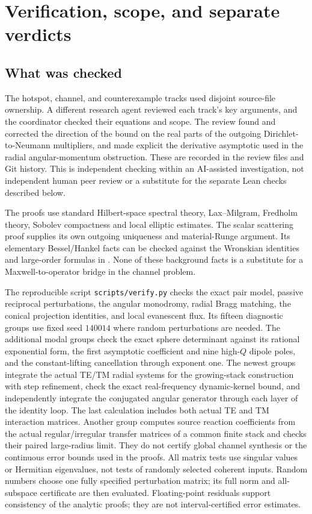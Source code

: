 \section{Verification, scope, and separate verdicts}
\label{ver:section}

\subsection{What was checked}
The hotspot, channel, and counterexample tracks used disjoint source-file
ownership. A different research agent reviewed each track's key arguments,
and the coordinator checked their equations and scope. The review found and
corrected the direction of the bound on the real parts of the outgoing
Dirichlet-to-Neumann multipliers, and made explicit the derivative
asymptotic used in the radial angular-momentum obstruction. These are
recorded in the review files and Git history. This is independent checking
within an AI-assisted investigation, not independent human peer review or
a substitute for the separate Lean checks described below.

The proofs use standard Hilbert-space spectral theory, Lax--Milgram,
Fredholm theory, Sobolev compactness and local elliptic estimates. The
scalar scattering proof supplies its own outgoing uniqueness and
material-Runge argument. Its elementary Bessel/Hankel facts can be checked
against the Wronskian identities and large-order formulas in
\cite{dlmf}. None of these background facts is a substitute for a
Maxwell-to-operator bridge in the channel problem.

The reproducible script \texttt{scripts/verify.py} checks the exact pair
model, passive reciprocal perturbations, the angular monodromy, radial
Bragg matching, the conical projection identities, and local evanescent
flux. Its fifteen diagnostic groups use fixed seed $140014$ where
random perturbations are needed.  The additional modal groups check
the exact sphere determinant against its rational exponential form,
the first asymptotic coefficient and nine high-$Q$ dipole poles,
and the constant-lifting cancellation through exponent one.
The newest groups integrate the actual TE/TM radial systems for the
growing-stack construction with step refinement, check the exact
real-frequency dynamic-kernel bound, and independently integrate the
conjugated angular generator through each layer of the identity loop.
The last calculation includes both actual TE and TM interaction matrices.
Another group computes source reaction coefficients from the actual
regular/irregular transfer matrices of a common finite stack and checks
their paired large-radius limit.
They do not certify global channel
synthesis or the continuous error bounds used in the proofs.
All matrix tests use singular values or Hermitian eigenvalues, not tests
of randomly selected coherent inputs. Random numbers choose one fully
specified perturbation matrix; its full norm and all-subspace certificate
are then evaluated. Floating-point residuals support consistency of the
analytic proofs; they are not interval-certified error estimates.

